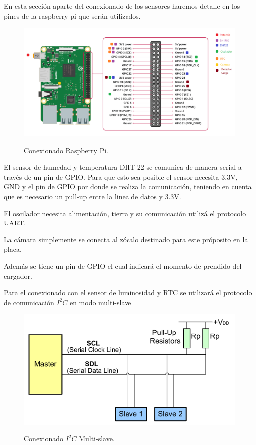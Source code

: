 En esta secci\'on aparte del conexionado de los sensores haremos detalle en los pines de la raspberry pi que ser\'an utilizados.
\begin{figure}[H]
	\centering
	\includegraphics[width=0.9\linewidth]{ImagenesIngenieria de Detalle/Conexionado_rpi}
	\label{fig:conexionado_Rpi}
	\caption{Conexionado Raspberry Pi.}
\end{figure}
El sensor de humedad y temperatura DHT-22 se comunica de manera serial a través de un pin de GPIO.
Para que esto sea posible el sensor necesita 3.3V, GND y el pin de GPIO por donde se realiza la  comunicación, teniendo en cuenta que es necesario un pull-up entre la linea de datos y 3.3V.

El oscilador necesita alimentación, tierra y su comunicación utilizá el protocolo UART.

La cámara simplemente se conecta al zócalo destinado para este próposito en la placa.

Además se tiene un pin de GPIO el cual indicará el momento de prendido del cargador.

Para el conexionado con el sensor de luminosidad y RTC se utilizará el protocolo de comunicación $I^2C$ en modo multi-slave

\begin{figure}[H]
	\centering
	\includegraphics[width=0.7\linewidth]{ImagenesIngenieria de Detalle/I2C_conexionado}
	\label{fig:conexionado_i2c}
	\caption{Conexionado $I^2C$ Multi-slave.}
\end{figure}


